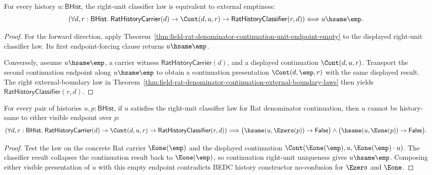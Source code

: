 \begin{theorem}
\label{thm:field-rat-denominator-continuation-right-unit-endpoint-iff-empty}
For every history $u:\mathsf{BHist}$, the right-unit classifier law is
equivalent to external emptiness:
$$
\left(
\forall d,r:\mathsf{BHist}.\;
\mathsf{RatHistoryCarrier}(d)\to
\Cont(d,u,r)\to
\mathsf{RatHistoryClassifier}(r,d)
\right)
\Longleftrightarrow
u\hsame\emp.
$$
\end{theorem}
\begin{proof}
For the forward direction, apply
Theorem~\ref{thm:field-rat-denominator-continuation-unit-endpoint-empty} to
the displayed right-unit classifier law. Its first endpoint-forcing clause
returns $u\hsame\emp$.

Conversely, assume $u\hsame\emp$, a carrier witness
$\mathsf{RatHistoryCarrier}(d)$, and a displayed continuation
$\Cont(d,u,r)$. Transport the second continuation endpoint along
$u\hsame\emp$ to obtain a continuation presentation $\Cont(d,\emp,r)$ with
the same displayed result. The right external-boundary law in
Theorem~\ref{thm:field-rat-denominator-continuation-external-boundary-laws}
then yields $\mathsf{RatHistoryClassifier}(r,d)$.
\end{proof}

\begin{theorem}
\label{thm:field-rat-denominator-continuation-right-unit-law-visible-endpoint-absurd}
For every pair of histories $u,p:\mathsf{BHist}$, if $u$ satisfies the
right-unit classifier law for Rat denominator continuation, then $u$ cannot be
history-same to either visible endpoint over $p$:
$$
\left(
\forall d,r:\mathsf{BHist}.\;
\mathsf{RatHistoryCarrier}(d)\to
\Cont(d,u,r)\to
\mathsf{RatHistoryClassifier}(r,d)
\right)
\Longrightarrow
\bigl(\hsame(u,\Ezero(p))\to\mathsf{False}\bigr)
\land
\bigl(\hsame(u,\Eone(p))\to\mathsf{False}\bigr).
$$
\end{theorem}
\begin{proof}
Test the law on the concrete Rat carrier $\Eone(\emp)$ and the displayed
continuation $\Cont(\Eone(\emp),u,\Eone(\emp)\cdot u)$. The classifier result
collapses the continuation result back to $\Eone(\emp)$, so continuation
right-unit uniqueness gives $u\hsame\emp$. Composing either visible presentation
of $u$ with this empty endpoint contradicts BEDC history constructor
no-confusion for $\Ezero$ and $\Eone$.
\end{proof}

